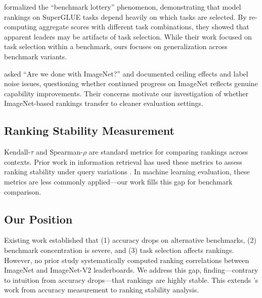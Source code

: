 \citet{dehghani2021benchmark} formalized the ``benchmark lottery'' phenomenon, demonstrating that model rankings on SuperGLUE tasks depend heavily on which tasks are selected. By re-computing aggregate scores with different task combinations, they showed that apparent leaders may be artifacts of task selection. While their work focused on task selection within a benchmark, ours focuses on generalization across benchmark variants.

\citet{beyer2020imagenet} asked ``Are we done with ImageNet?'' and documented ceiling effects and label noise issues, questioning whether continued progress on ImageNet reflects genuine capability improvements. Their concerns motivate our investigation of whether ImageNet-based rankings transfer to cleaner evaluation settings.

\subsection{Ranking Stability Measurement}

Kendall-$\tau$ and Spearman-$\rho$ are standard metrics for comparing rankings across contexts. Prior work in information retrieval has used these metrics to assess ranking stability under query variations \citep{voorhees2000variations}. In machine learning evaluation, these metrics are less commonly applied---our work fills this gap for benchmark comparison.

\subsection{Our Position}

Existing work established that (1) accuracy drops on alternative benchmarks, (2) benchmark concentration is severe, and (3) task selection affects rankings. However, no prior study systematically computed ranking correlations between ImageNet and ImageNet-V2 leaderboards. We address this gap, finding---contrary to intuition from accuracy drops---that rankings are highly stable. This extends \citet{recht2019imagenet}'s work from accuracy measurement to ranking stability analysis.
